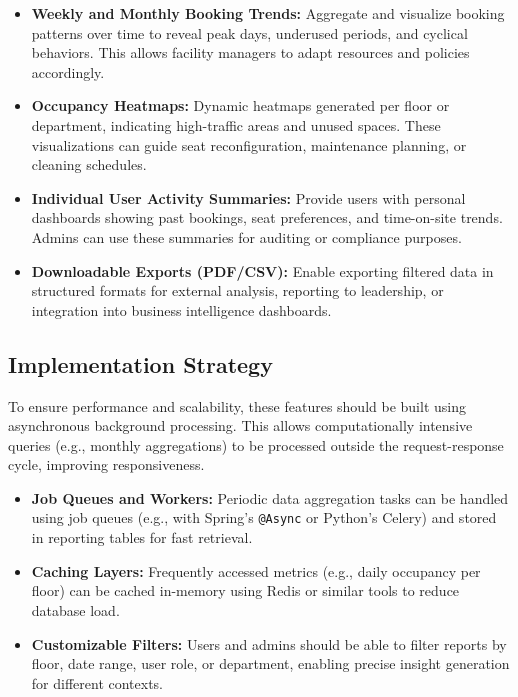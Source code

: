 \documentclass[12pt,a4paper]{report} %
\begin{document}
\begin{itemize}
    \item \textbf{Weekly and Monthly Booking Trends:}  
    Aggregate and visualize booking patterns over time to reveal peak days, underused periods, and cyclical behaviors. This allows facility managers to adapt resources and policies accordingly.
    \item \textbf{Occupancy Heatmaps:}  
    Dynamic heatmaps generated per floor or department, indicating high-traffic areas and unused spaces. These visualizations can guide seat reconfiguration, maintenance planning, or cleaning schedules.
    \item \textbf{Individual User Activity Summaries:}  
    Provide users with personal dashboards showing past bookings, seat preferences, and time-on-site trends. Admins can use these summaries for auditing or compliance purposes.
    \item \textbf{Downloadable Exports (PDF/CSV):}  
    Enable exporting filtered data in structured formats for external analysis, reporting to leadership, or integration into business intelligence dashboards.
\end{itemize}

\subsection*{Implementation Strategy}

To ensure performance and scalability, these features should be built using asynchronous background processing. This allows computationally intensive queries (e.g., monthly aggregations) to be processed outside the request-response cycle, improving responsiveness.

\begin{itemize}
    \item \textbf{Job Queues and Workers:}  
    Periodic data aggregation tasks can be handled using job queues (e.g., with Spring's \texttt{@Async} or Python's Celery) and stored in reporting tables for fast retrieval.
    \item \textbf{Caching Layers:}  
    Frequently accessed metrics (e.g., daily occupancy per floor) can be cached in-memory using Redis or similar tools to reduce database load.
    \item \textbf{Customizable Filters:}  
    Users and admins should be able to filter reports by floor, date range, user role, or department, enabling precise insight generation for different contexts.
\end{itemize}
\end{document}
